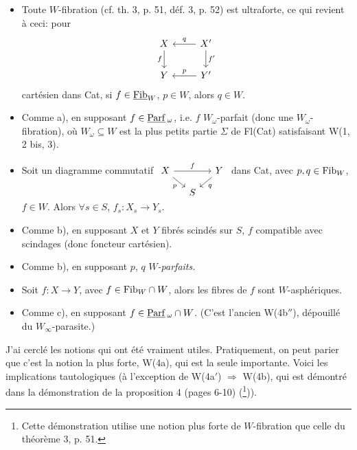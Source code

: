 \begin{itemize}[leftmargin=5em,labelsep=0.5em]
\item[\fbox{W(4a)}] Toute $W$-fibration (cf. th. 3, p. 51, déf. 3, p. 52) est ultraforte, ce qui revient à ceci: pour
\[
\begin{tikzcd}
X & X' \arrow[l,"q"'] \arrow[d,"f'"] \\
Y \arrow[from=u,"f"'] & Y' \arrow[l,"p"']
\end{tikzcd}
\]
cartésien dans Cat, si $f \in \underline{\mathrm{Fib}}_W$, $p \in W$, alors $q \in W$.

\item[W(4a$'$)] Comme a), en supposant $f \in \underline{\mathrm{Parf}}\,_\omega$, i.e. $f$ $W_\omega$-parfait (donc une $W_\omega$-fibration), où $W_\omega \subseteq W$ est la plus petits partie $\Sigma$ de Fl(Cat) satisfaisant W(1, 2 bis, 3). %

\item[\fbox{W(4b)}] Soit un diagramme commutatif
$\begin{tikzcd}[ampersand replacement=\&, column sep=small, row sep=small, baseline=(X.base)]
|[alias=X]| X \arrow[rr,"f"] \arrow[dr,"p"'] \& \& Y \arrow[dl,"q"] \\
\& S \&
\end{tikzcd}$
dans Cat, avec $p, q \in \mathrm{Fib}_W$, $f \in W$.
Alors $\forall s \in S$, $f_s : X_s \longrightarrow Y_s$.

\item[W(4b$'$)] Comme b), en supposant $X$ et $Y$ fibrés scindés sur $S$, $f$ compatible avec scindages (donc foncteur cartésien).

\item[W(4b$''$)] Comme b), en supposant $p$, $q$ $W$\textit{-parfaits.}

\item[\fbox{W(4c)}] Soit $f : X \longrightarrow Y$, avec $f \in \mathrm{Fib}_W \cap W$, alors les fibres de $f$ sont $W$-asphériques.

\item[\dashedbox{W(4c$'$)}] Comme c), en supposant $f \in \underline{\mathrm{Parf}}\,_\omega \cap W$. (C'est l'ancien W(4b$''$), dépouillé du $W_\infty$-parasite.)
\end{itemize}


J'ai cerclé les notions qui ont été vraiment utiles. Pratiquement, on peut parier que c'est la notion la plus forte, W(4a), qui est la seule importante. Voici les implications tautologiques (à l'exception de W(4a$'$) $\Longrightarrow$ W(4b), qui est démontré dans la démonstration de la proposition 4 (pages 6-10) (\footnote[61]{Cette démonstration utilise une notion plus forte de $W$-fibration que celle du théorème 3, p. 51.})).

